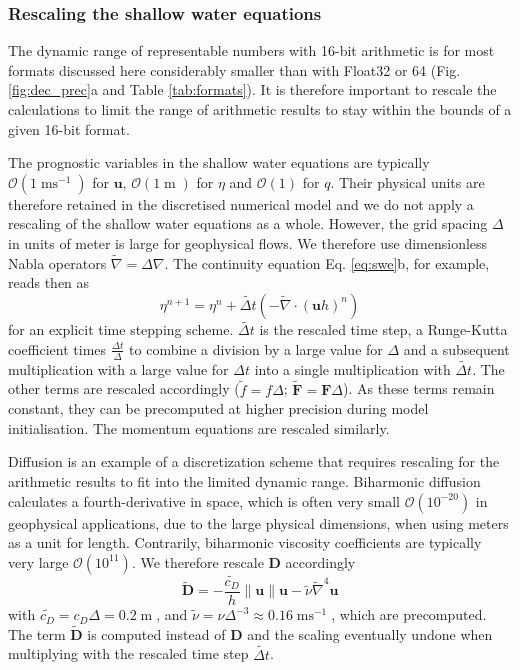 \documentclass[draft]{agujournal2019}
\newcommand{\op}{\operatorname}
\begin{document}
\subsubsection{Rescaling the shallow water equations}
\label{sec:swm_rescale}

The dynamic range of representable numbers with 16-bit arithmetic is for most
formats discussed here considerably smaller than with Float32 or 64
(Fig. \ref{fig:dec_prec}a and Table \ref{tab:formats}). It is therefore
important to rescale the calculations to limit the range of
arithmetic results to stay within the bounds of a given 16-bit format.

The prognostic variables in the shallow water equations are typically
$\mathcal{O}(1\op{ms}^{-1})$ for $\mathbf{u}$, $\mathcal{O}(1\op{m})$ for
$\eta$ and $\mathcal{O}(1)$ for $q$. Their physical units are therefore retained
in the discretised numerical model and we do not apply a rescaling of the shallow
water equations as a whole. However, the grid spacing $\Delta$ in units of meter
is large for geophysical flows. We therefore use dimensionless Nabla operators
$\tilde{\nabla} = \Delta\nabla$. The continuity equation Eq. \ref{eq:swe}b,
for example, reads then as
\begin{equation}
\eta^{n+1} = \eta^n + \tilde{\Delta t}\left( - \tilde{\nabla} \cdot (\mathbf{u}h)^n\right)
\label{eq:discr}
\end{equation}
for an explicit time stepping scheme. $\tilde{\Delta t}$ is the rescaled time
step, a Runge-Kutta coefficient times $\tfrac{\Delta t}{\Delta}$ to combine a
division by a large value for $\Delta$ and a subsequent multiplication with a
large value for $\Delta t$ into a single multiplication with $\tilde{\Delta t}$.
The other terms are rescaled accordingly ($\tilde{f} = f\Delta$;
$\tilde{\mathbf{F}} = \mathbf{F}\Delta$). As these terms remain constant, they
can be precomputed at higher precision during model initialisation.
The momentum equations are rescaled similarly.

Diffusion is an example of a discretization scheme that requires rescaling for
the arithmetic results to fit into the limited dynamic range. Biharmonic diffusion
\cite{Griffies2000} calculates a fourth-derivative in space,
which is often very small $\mathcal{O}(10^{-20})$ in geophysical applications,
due to the large physical dimensions, when using meters as a unit for length.
Contrarily, biharmonic viscosity coefficients are typically very large
$\mathcal{O}(10^{11})$.
We therefore rescale $\mathbf{D}$ accordingly
\begin{equation}
\tilde{\mathbf{D}} =-\frac{\tilde{c_D}}{h}\| \mathbf{u} \| \mathbf{u} -
\tilde{\nu}\tilde{\nabla}^4\mathbf{u}
\end{equation}
with $\tilde{c_D} = c_D\Delta = 0.2\op{m}$,  and $\tilde{\nu} = \nu\Delta^{-3}
\approx 0.16\op{ms}^{-1}$, which are precomputed. The term
$\tilde{\mathbf{D}}$ is computed instead of $\mathbf{D}$ and the scaling eventually
undone when multiplying with the rescaled time step $\tilde{\Delta t}$.
\end{document}
